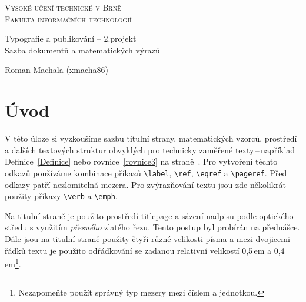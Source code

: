\documentclass[twocolumn, 11pt, a4paper]{article}[16.03.2023]
\begin{document}
\begin{titlepage}
    \begin{center}
        
        {\Huge \textsc{Vysoké učení technické v Brně}\\[0.5em]}
        {\huge \textsc{Fakulta informačních technologií}}
    
        {\LARGE Typografie a publikování -- 2.projekt\\[0.4em]
        Sazba dokumentů a matematických výrazů}
    
        {\Large \the\year \hfill Roman Machala (xmacha86)}
    \end{center}
    
\end{titlepage}

\section*{Úvod}

V této úloze si vyzkoušíme sazbu titulní strany, 
matematických vzorců, prostředí a dalších textových struktur 
obvyklých pro technicky zaměřené texty\,--\,například Definice~\ref{Definice} nebo rovnice~\eqref{rovnice3} na straně~\pageref{1}. 
Pro vytvoření těchto odkazů používáme kombinace příkazů \verb|\label|, \verb|\ref|, \verb|\eqref| a \verb|\pageref|. 
Před odkazy patří nezlomitelná mezera. Pro zvýrazňování textu jsou zde 
několikrát použity příkazy \verb|\verb| a \verb|\emph|. 

Na titulní straně je použito prostředí titlepage a sázení nadpisu 
podle optického středu s využitím \emph{přesného} zlatého řezu. 
Tento postup byl probírán na přednášce. 
Dále jsou na titulní straně použity čtyři různé velikosti písma a mezi 
dvojicemi řádků textu je použito odřádkování se zadanou relativní 
velikostí 0,5\,em a 0,4\,em\footnote[1]{Nezapomeňte použít správný typ mezery mezi číslem a jednotkou.}.
\end{document}
